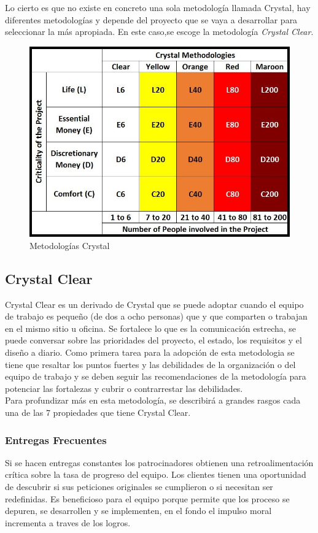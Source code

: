 Lo cierto es que no existe en concreto una sola metodología llamada Crystal, hay diferentes metodologías y depende del proyecto que se vaya a desarrollar para seleccionar la más apropiada. En este caso,se escoge la metodología \emph{Crystal Clear}.\\

\begin{figure}[h!]
	\centering
	\includegraphics[width=0.7\linewidth]{proyecto/imgs/crystalM}
	\caption{Metodologías Crystal}
	\label{fig:crystalm}
\end{figure}


\subsection{Crystal Clear}
Crystal Clear es un derivado de Crystal que se puede adoptar cuando el equipo de trabajo es pequeño (de dos a ocho personas) que y que comparten o trabajan en el mismo sitio u oficina. Se fortalece lo que es la comunicación estrecha, se puede conversar sobre las prioridades del proyecto, el estado, los requisitos y el diseño a diario. Como primera tarea para la adopción de esta metodologia se tiene que resaltar los puntos fuertes y las debilidades de la organización o del equipo de trabajo y se deben seguir las recomendaciones de la metodología para potenciar las fortalezas y cubrir o contrarrestar las debilidades. \\

Para profundizar más en esta metodología, se describirá a grandes rasgos cada una de las 7 propiedades que tiene Crystal Clear.

\subsubsection{Entregas Frecuentes}
Si se hacen entregas constantes los patrocinadores obtienen una retroalimentación crítica sobre la tasa de progreso del equipo. Los clientes tienen una oportunidad de descubrir si sus peticiones originales se cumplieron o si necesitan ser redefinidas. Es beneficioso para el equipo porque permite que los proceso se depuren, se desarrollen y se implementen, en el fondo el impulso moral incrementa a traves de los logros.\\

